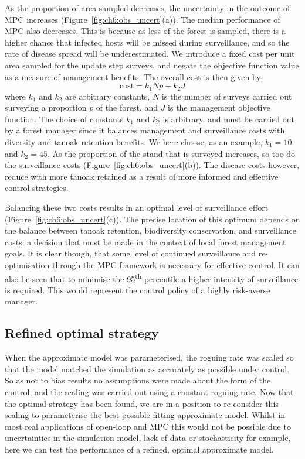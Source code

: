As the proportion of area sampled decreases, the uncertainty in the outcome of MPC increases (Figure~\ref{fig:ch6:obs_uncert}(a)). The median performance of MPC also decreases. This is because as less of the forest is sampled, there is a higher chance that infected hosts will be missed during surveillance, and so the rate of disease spread will be underestimated. We introduce a fixed cost per unit area sampled for the update step surveys, and negate the objective function value as a measure of management benefits. The overall cost is then given by:
\begin{equation}
    \textrm{cost} = k_1Np - k_2J
\end{equation}
where $k_1$ and $k_2$ are arbitrary constants, $N$ is the number of surveys carried out surveying a proportion $p$ of the forest, and $J$ is the management objective function. The choice of constants $k_1$ and $k_2$ is arbitrary, and must be carried out by a forest manager since it balances management and surveillance costs with diversity and tanoak retention benefits. We here choose, as an example, $k_1= 10$ and $k_2 = 45$. As the proportion of the stand that is surveyed increases, so too do the surveillance costs (Figure~\ref{fig:ch6:obs_uncert}(b)). The disease costs however, reduce with more tanoak retained as a result of more informed and effective control strategies. 

Balancing these two costs results in an optimal level of surveillance effort (Figure~\ref{fig:ch6:obs_uncert}(c)). The precise location of this optimum depends on the balance between tanoak retention, biodiversity conservation, and surveillance costs: a decision that must be made in the context of local forest management goals. It is clear though, that some level of continued surveillance and re-optimisation through the MPC framework is necessary for effective control. It can also be seen that to minimise the 95\textsuperscript{th} percentile a higher intensity of surveillance is required. This would represent the control policy of a highly risk-averse manager.

\FloatBarrier
\newpage
\subsection{Refined optimal strategy\label{sec:ch6:refined_strat}}

When the approximate model was parameterised, the roguing rate was scaled so that the model matched the simulation as accurately as possible under control. So as not to bias results no assumptions were made about the form of the control, and the scaling was carried out using a constant roguing rate. Now that the optimal strategy has been found, we are in a position to re-consider this scaling to parameterise the best possible fitting approximate model. Whilst in most real applications of open-loop and MPC this would not be possible due to uncertainties in the simulation model, lack of data or stochasticity for example, here we can test the performance of a refined, optimal approximate model.

